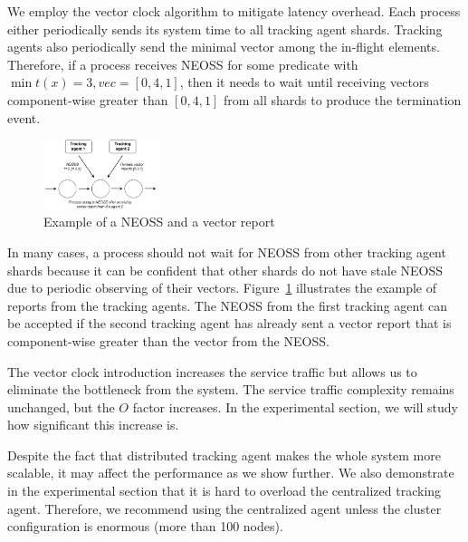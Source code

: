 We employ the vector clock algorithm to mitigate latency overhead. Each process either periodically sends its system time to all tracking agent shards. Tracking agents also periodically send the minimal vector among the in-flight elements. Therefore, if a process receives NEOSS for some predicate with $\min t(x) = 3, vec=[0,4,1]$, then it needs to wait until receiving vectors component-wise greater than $[0,4,1]$ from all shards to produce the termination event.

\begin{figure}[t]
  \centering
  \includegraphics[width=0.3\textwidth]{pics/distributed-tracker.pdf}
  \caption{Example of a NEOSS and a vector report}
  \label{fig:distributed-tracker}
\end{figure}

In many cases, a process should not wait for NEOSS from other tracking agent shards because it can be confident that other shards do not have stale NEOSS due to periodic observing of their vectors. Figure~\ref{fig:distributed-tracker} illustrates the example of reports from the tracking agents. The NEOSS from the first tracking agent can be accepted if the second tracking agent has already sent a vector report that is component-wise greater than the vector from the NEOSS.

The vector clock introduction increases the service traffic but allows us to eliminate the bottleneck from the system. The service traffic complexity remains unchanged, but the $O$ factor increases. In the experimental section, we will study how significant this increase is.

Despite the fact that distributed tracking agent makes the whole system more scalable, it may affect the performance as we show further. We also demonstrate in the experimental section that it is hard to overload the centralized tracking agent. Therefore, we recommend using the centralized agent unless the cluster configuration is enormous (more than 100 nodes).
